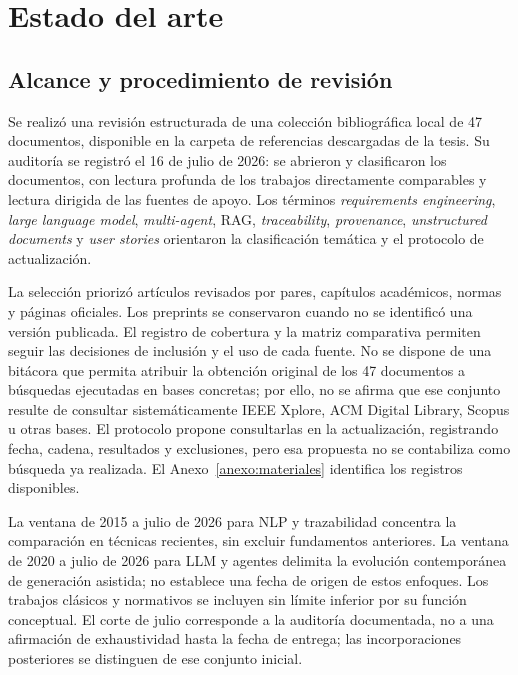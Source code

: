 \chapter{Estado del arte}
\label{cap:estado-arte}

\section{Alcance y procedimiento de revisión}

Se realizó una revisión estructurada de una colección bibliográfica local de 47 documentos, disponible en la carpeta de referencias descargadas de la tesis. Su auditoría se registró el 16 de julio de 2026: se abrieron y clasificaron los documentos, con lectura profunda de los trabajos directamente comparables y lectura dirigida de las fuentes de apoyo. Los términos \emph{requirements engineering}, \emph{large language model}, \emph{multi-agent}, RAG, \emph{traceability}, \emph{provenance}, \emph{unstructured documents} y \emph{user stories} orientaron la clasificación temática y el protocolo de actualización.

La selección priorizó artículos revisados por pares, capítulos académicos, normas y páginas oficiales. Los preprints se conservaron cuando no se identificó una versión publicada. El registro de cobertura y la matriz comparativa permiten seguir las decisiones de inclusión y el uso de cada fuente. No se dispone de una bitácora que permita atribuir la obtención original de los 47 documentos a búsquedas ejecutadas en bases concretas; por ello, no se afirma que ese conjunto resulte de consultar sistemáticamente IEEE Xplore, ACM Digital Library, Scopus u otras bases. El protocolo propone consultarlas en la actualización, registrando fecha, cadena, resultados y exclusiones, pero esa propuesta no se contabiliza como búsqueda ya realizada. El Anexo~\ref{anexo:materiales} identifica los registros disponibles.

La ventana de 2015 a julio de 2026 para NLP y trazabilidad concentra la comparación en técnicas recientes, sin excluir fundamentos anteriores. La ventana de 2020 a julio de 2026 para LLM y agentes delimita la evolución contemporánea de generación asistida; no establece una fecha de origen de estos enfoques. Los trabajos clásicos y normativos se incluyen sin límite inferior por su función conceptual. El corte de julio corresponde a la auditoría documentada, no a una afirmación de exhaustividad hasta la fecha de entrega; las incorporaciones posteriores se distinguen de ese conjunto inicial.

